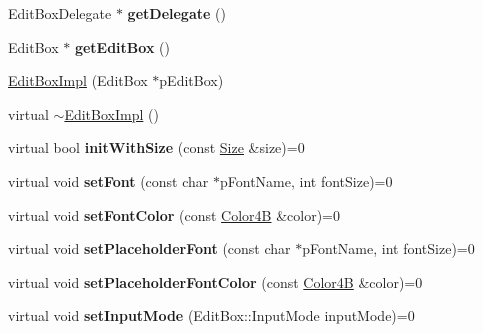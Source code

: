 \begin{DoxyCompactItemize}
Edit\+Box\+Delegate $\ast$ {\bfseries get\+Delegate} ()
\item 
\mbox{\label{classcocos2d_1_1ui_1_1EditBoxImpl_ab22123f065dfe3ad6b022414a4753a1a}} 
Edit\+Box $\ast$ {\bfseries get\+Edit\+Box} ()
\item 
\hyperlink{classcocos2d_1_1ui_1_1EditBoxImpl_a17428b425795ede3896056fd521c5cd4}{Edit\+Box\+Impl} (Edit\+Box $\ast$p\+Edit\+Box)
\item 
virtual \hyperlink{classcocos2d_1_1ui_1_1EditBoxImpl_afd129ad831a993e7bf076f716fa5e275}{$\sim$\+Edit\+Box\+Impl} ()
\item 
\mbox{\label{classcocos2d_1_1ui_1_1EditBoxImpl_ad0ac7f338b202d899b6fd6840923ac77}} 
virtual bool {\bfseries init\+With\+Size} (const \hyperlink{classSize}{Size} \&size)=0
\item 
\mbox{\label{classcocos2d_1_1ui_1_1EditBoxImpl_a4df60b8814b48a26909ceb4413b14154}} 
virtual void {\bfseries set\+Font} (const char $\ast$p\+Font\+Name, int font\+Size)=0
\item 
\mbox{\label{classcocos2d_1_1ui_1_1EditBoxImpl_a860eeaedf1a515ecdb2cec2487c57070}} 
virtual void {\bfseries set\+Font\+Color} (const \hyperlink{structColor4B}{Color4B} \&color)=0
\item 
\mbox{\label{classcocos2d_1_1ui_1_1EditBoxImpl_ad88ce793a7c805c978746c48227929c9}} 
virtual void {\bfseries set\+Placeholder\+Font} (const char $\ast$p\+Font\+Name, int font\+Size)=0
\item 
\mbox{\label{classcocos2d_1_1ui_1_1EditBoxImpl_ad5d4014b8c6bf2c6eb40ecd5485ce6cb}} 
virtual void {\bfseries set\+Placeholder\+Font\+Color} (const \hyperlink{structColor4B}{Color4B} \&color)=0
\item 
\mbox{\label{classcocos2d_1_1ui_1_1EditBoxImpl_a38f9120065cbce17dc918b5b78e1d47b}} 
virtual void {\bfseries set\+Input\+Mode} (Edit\+Box\+::\+Input\+Mode input\+Mode)=0
\item 
\mbox{\label{classcocos2d_1_1ui_1_1EditBoxImpl_a695ffdb8fb11a934c4df7f33a8d825cf}} 

\end{DoxyCompactItemize}
